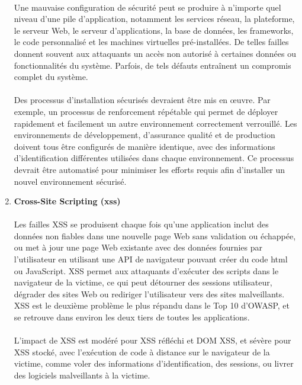\begin{enumerate}[label=\roman*)]
		\paragraph{}
		Une mauvaise configuration de sécurité peut se produire à n'importe quel niveau d'une pile d'application, notamment les services réseau, la plateforme, le serveur Web, le serveur d'applications, la base de données, les frameworks, le code personnalisé et les machines virtuelles pré-installées.
		De telles failles donnent souvent aux attaquants un accès non autorisé à certaines données ou fonctionnalités du système. Parfois, de tels défauts entraînent un compromis complet du système.
		\paragraph{}
		Des processus d'installation sécurisés devraient être mis en œuvre. Par exemple, un processus de renforcement répétable qui permet de déployer rapidement et facilement un autre environnement correctement verrouillé. Les environnements de développement, d'assurance qualité et de production doivent tous être configurés de manière identique, avec des informations d'identification différentes utilisées dans chaque environnement. Ce processus devrait être automatisé pour minimiser les efforts requis afin d'installer un nouvel environnement sécurisé.

		\vspace*{0.8cm} \item \textbf{Cross-Site Scripting (\gls{xss})} \vspace*{-0.4cm}
		\paragraph{}
		Les failles XSS se produisent chaque fois qu'une application inclut des données non fiables dans une nouvelle page Web sans validation ou échappée, ou met à jour une page Web existante avec des données fournies par l'utilisateur en utilisant une API de navigateur pouvant créer du code \gls{html} ou JavaScript. XSS permet aux attaquants d'exécuter des scripts dans le navigateur de la victime, ce qui peut détourner des sessions utilisateur, dégrader des sites Web ou rediriger l'utilisateur vers des sites malveillants.
		XSS est le deuxième problème le plus répandu dans le Top 10 d'OWASP, et se retrouve dans environ les deux tiers de toutes les applications.
		\paragraph{}
		L'impact de XSS est modéré pour XSS réfléchi et DOM XSS, et sévère pour XSS stocké, avec l'exécution de code à distance sur le navigateur de la victime, comme voler des informations d'identification, des sessions, ou livrer des logiciels malveillants à la victime.

\end{enumerate}
